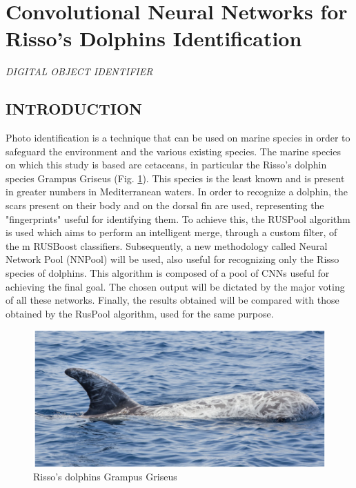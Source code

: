 \section{Convolutional Neural Networks for Risso’s Dolphins Identification}

\begin{center}
    \author{
    Rosalia Maglietta,
    Vito Renò,
    Rocco Cacioppoli,
    Emanuele Seller,
    Stefano Bellomo,
    Francesca Cornelia Santacesaria,
    Roberto Colella,
    Giulia Cipriano,
    Ettore Stella,
    Karin Hartman,
    Carmelo Fanizza,
    Giovanni Dimauro,
    \emph{(Member, IEEE)},
    Roberto Carlucci
    }
\end{center}

\begin{center}
    \emph{DIGITAL OBJECT IDENTIFIER}
\end{center}

\subsection{INTRODUCTION}
Photo identification is a technique that can be used on marine species in 
order to safeguard the environment and the various existing species. The 
marine species on which this study is based are cetaceans, in particular the 
Risso's dolphin species Grampus Griseus (Fig. \ref{fig:Risso}). This species is the least 
known and is present in greater numbers in Mediterranean waters. In order to 
recognize a dolphin, the scars present on their body and on the dorsal fin are 
used, representing the "fingerprints" useful for identifying them. To achieve 
this, the RUSPool algorithm is used which aims to perform an intelligent 
merge, through a custom filter, of the m RUSBoost classifiers. Subsequently, 
a new methodology called Neural Network Pool (NNPool) will be used, also 
useful for recognizing only the Risso species of dolphins. This algorithm is 
composed of a pool of CNNs useful for achieving the final goal. The chosen 
output will be dictated by the major voting of all these networks. Finally, 
the results obtained will be compared with those obtained by the RusPool 
algorithm, used for the same purpose.
\begin{figure}[h!]
    \centering
    \includegraphics[width = 0.8\linewidth]{images/paper10/Risso.png}
    \centering
    \caption{Risso’s dolphins Grampus Griseus}
    \label{fig:Risso}
\end{figure}


